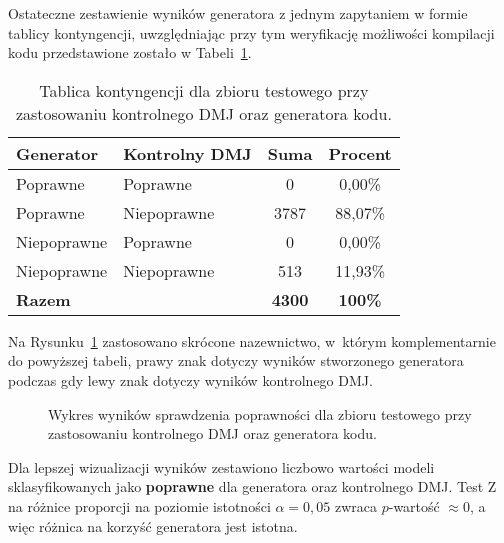 Ostateczne zestawienie wyników generatora z jednym zapytaniem w formie tablicy kontyngencji, uwzględniając przy tym weryfikację możliwości kompilacji kodu przedstawione zostało w Tabeli~\ref{tab:tabela11}.

\begin{table}[H]
\caption{Tablica kontyngencji dla zbioru testowego przy zastosowaniu kontrolnego DMJ oraz generatora kodu.}\label{tab:tabela11}
\centering%
\begin{tabular}{|l|l|c|c|}
\hline
\textbf{Generator} & \textbf{Kontrolny DMJ} & \textbf{Suma} & \textbf{Procent} \\
\hline
Poprawne & Poprawne & 0 & 0,00\% \\
\hline
Poprawne & Niepoprawne & 3787 & 88,07\% \\
\hline
Niepoprawne & Poprawne & 0 & 0,00\% \\
\hline
Niepoprawne & Niepoprawne & 513 & 11,93\% \\
\hline
\textbf{Razem} & & \textbf{4300} & \textbf{100\%} \\
\hline
\end{tabular}
\end{table}

Na Rysunku~\ref{rys:plama2k} zastosowano skrócone nazewnictwo, w~którym komplementarnie do powyższej tabeli, prawy znak dotyczy wyników stworzonego generatora podczas gdy lewy znak dotyczy wyników kontrolnego DMJ.

\begin{figure}[H]
\centering
{}
\caption{Wykres wyników sprawdzenia poprawności dla zbioru testowego przy zastosowaniu kontrolnego DMJ oraz generatora kodu.}\label{rys:plama2k}
\end{figure}

Dla lepszej wizualizacji wyników zestawiono liczbowo wartości modeli sklasyfikowanych jako \textbf{poprawne} dla generatora  oraz kontrolnego DMJ. %
Test Z na różnice proporcji na poziomie istotności $\alpha=0,05$ zwraca $p$-wartość $\approx 0$, a więc różnica na korzyść generatora jest istotna.

